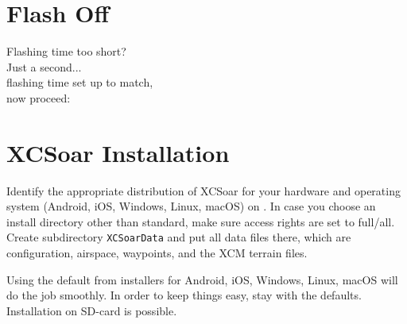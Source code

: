\documentclass[english,a4paper,12pt]{refrep}
\begin{document}
\section*{{\color[rgb]{.9,.85,0}Flash} Off}

\vspace{2em}
\hspace*{1cm} Flashing time too short?\\
\hspace*{4cm} Just a second...\\
\hspace*{6cm} flashing time set up to match,\\
\hspace*{10cm} now proceed:


\setlength{\parskip}{0.3\baselineskip}
\newpage
\section{XCSoar Installation}\label{ch:XCSinstall}


Identify the appropriate distribution of XCSoar for your hardware and 
operating system \textsf{(Android, iOS, Windows, Linux, macOS)} 
on \xcsoarwebsite{}.
In case you choose an install directory other than standard, make sure access 
rights are set to full/all. Create subdirectory \texttt{XCSoarData} and put all 
data files there, which are configuration, airspace, waypoints, and the XCM 
terrain files.

Using the default from installers for Android, iOS, Windows, Linux, macOS will do the 
job smoothly.  In order to keep things easy, stay with the defaults. 
Installation on SD-card is possible.
\end{document}
